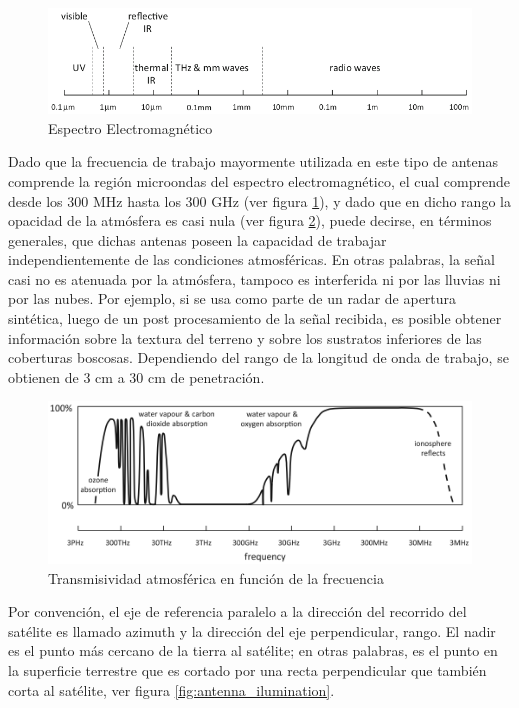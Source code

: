 \begin{figure}[H]
 \centering
 \includegraphics[width=12cm]{gfx/electromagneticSpectrum.png}
 \caption{Espectro Electromagnético \cite{Richards2009}}
 \label{fig:spectrum}
\end{figure}

Dado que la frecuencia de trabajo mayormente utilizada en este tipo de antenas comprende la región microondas del espectro
electromagnético, el cual comprende desde los 300 MHz hasta los 300 GHz (ver figura \ref{fig:spectrum}), y dado que en dicho rango la 
opacidad de la atmósfera es casi nula (ver figura \ref{fig:atmosphere}), puede decirse, en términos generales, que dichas 
antenas poseen la capacidad de trabajar independientemente de las condiciones atmosféricas. En otras palabras, la señal casi no es 
atenuada por la atmósfera, tampoco es interferida ni por las lluvias ni por las nubes. Por ejemplo, si se usa como parte de un 
radar de apertura sintética, luego de un post procesamiento de la señal recibida, es posible obtener información sobre la 
textura del terreno y sobre los sustratos inferiores de las coberturas boscosas. Dependiendo del rango de la longitud de onda de
trabajo, se obtienen de 3 cm a 30 cm de penetración.

\begin{figure}[H]
 \centering
 \includegraphics[width=12cm]{gfx/atmosphericOpacity.png}
 \caption{Transmisividad atmosférica en función de la frecuencia \cite{Richards2013}}
 \label{fig:atmosphere}
\end{figure}

Por convención, el eje de referencia paralelo a la dirección del recorrido del satélite es llamado azimuth y la
dirección del eje perpendicular, rango. El nadir es el punto más cercano de la tierra al satélite; en otras palabras,
es el punto en la superficie terrestre que es cortado por una recta perpendicular que también corta al satélite, ver figura
\ref{fig:antenna_ilumination}.

